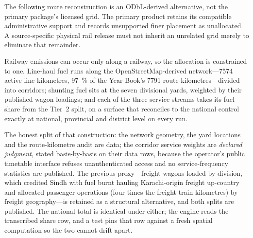 The following route reconstruction is an ODbL-derived alternative, not the primary package's licensed grid. The primary product retains its compatible administrative support and records unsupported finer placement as unallocated. A source-specific physical rail release must not inherit an unrelated grid merely to eliminate that remainder.

Railway emissions can occur only along a railway, so the allocation is constrained to one.
Line-haul fuel runs along the OpenStreetMap-derived network---\num{7574} active
line-kilometres, \SI{97}{\percent} of the Year Book's \num{7791} route-kilometres---divided
into corridors; shunting fuel sits at the seven divisional yards, weighted by their
published wagon loadings; and each of the three service streams takes its fuel share from
the Tier~2 split, on a surface that reconciles to the national control exactly at national,
provincial and district level on every run.

The honest split of that construction: the network geometry, the yard locations and the
route-kilometre audit are data; the corridor service weights are \emph{declared judgment},
stated basis-by-basis on their data rows, because the operator's public timetable interface
refuses unauthenticated access and no service-frequency statistics are published. The
previous proxy---freight wagons loaded by division, which credited Sindh with fuel burnt
hauling Karachi-origin freight up-country and allocated passenger operations (four times the
freight train-kilometres) by freight geography---is retained as a structural alternative,
and both splits are published. The national total is identical under either; the engine
reads the transcribed share row, and a test pins that row against a fresh spatial
computation so the two cannot drift apart.
